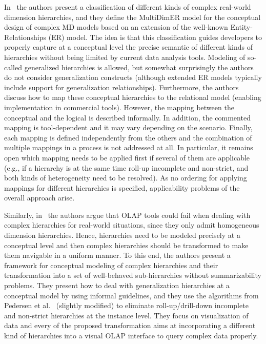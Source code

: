 In~\cite{DBLP:conf/caise/MalinowskiZ04,DBLP:journals/dke/MalinowskiZ06}
the authors present a classification of different kinds of complex
real-world dimension hierarchies, and they define the MultiDimER
model for the conceptual design of complex MD models based on an
extension of the well-known Entity-Relationships (ER) model. The
idea is that this classification guides developers to properly
capture at a conceptual level the precise semantic of different
kinds of hierarchies without being limited by current data analysis
tools. Modeling of so-called generalized hierarchies is allowed, but
somewhat surprisingly the authors do not consider generalization
constructs (although extended ER models typically include support
for generalization relationships). Furthermore, the authors discuss
how to map these conceptual hierarchies to the relational model
(enabling implementation in commercial tools). However, the mapping
between the conceptual and the logical is described informally. In
addition, the commented mapping is tool-dependent and it may vary
depending on the scenario. Finally, each mapping is defined
independently from the others and the combination of multiple
mappings in a process is not addressed at all. In particular, it
remains open which mapping needs to be applied first if several of
them are applicable (e.g., if a hierarchy is at the same time
roll-up incomplete and non-strict, and both kinds of heterogeneity
need to be resolved). As no ordering for applying mappings for
different hierarchies is specified, applicability problems of the
overall approach arise.

Similarly, in~\cite{DBLP:conf/dawak/MansmannS06,MansmannIJDWDM07}
the authors argue that OLAP tools could fail when dealing with
complex hierarchies for real-world situations, since they only admit
homogeneous dimension hierarchies. Hence, hierarchies need to be
modeled precisely at a conceptual level and then complex hierarchies
should be transformed to make them navigable in a uniform manner. To
this end, the authors present a framework for conceptual modeling of
complex hierarchies and their transformation into a set of
well-behaved sub-hierarchies without summarizability problems. They
present how to deal with generalization hierarchies at a conceptual
model by using informal guidelines, and they use the algorithms from
Pedersen et al.~\cite{DBLP:conf/vldb/PedersenJD99} (slightly
modified) to eliminate roll-up/drill-down incomplete and non-strict
hierarchies at the instance level. They focus on visualization of
data and every of the proposed transformation aims at incorporating
a different kind of hierarchies into a visual OLAP interface to
query complex data properly.

